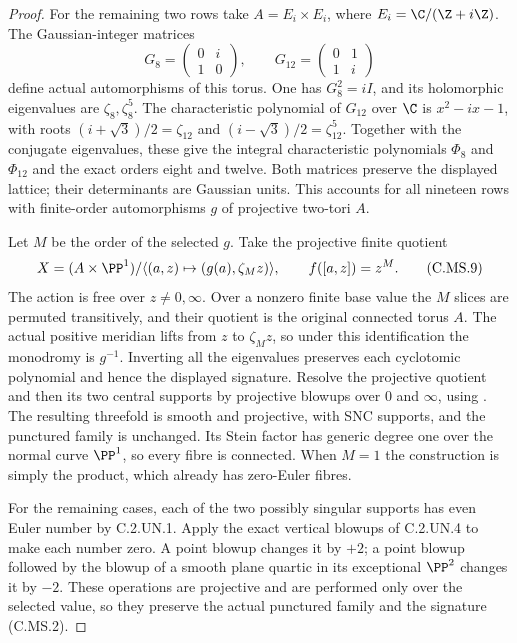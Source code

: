 \begin{proof}
For the remaining two rows take
$A=E_i\times E_i$, where
$E_i=\C/(\Z+i\Z)$. The Gaussian-integer
matrices
\[
 G_8=\begin{pmatrix}0&i\\1&0\end{pmatrix},
 \qquad
 G_{12}=\begin{pmatrix}0&1\\1&i\end{pmatrix}
 \tag{C.MS.8}
\]
define actual automorphisms of this torus.
One has $G_8^2=iI$, and its holomorphic
eigenvalues are $\zeta_8,\zeta_8^5$.
The characteristic polynomial of $G_{12}$
over $\C$ is $x^2-ix-1$, with roots
$(i+\sqrt3)/2=\zeta_{12}$ and
$(i-\sqrt3)/2=\zeta_{12}^5$.
Together with the conjugate eigenvalues,
these give the integral characteristic
polynomials $\Phi_8$ and $\Phi_{12}$ and
the exact orders eight and twelve.
Both matrices preserve the displayed lattice;
their determinants are Gaussian units.
This accounts for all nineteen rows with
finite-order automorphisms $g$ of projective
two-tori $A$.

Let $M$ be the order of the selected $g$.
Take the projective finite quotient
\[
 X=(A\times\PP^1)/
       \langle(a,z)\mapsto(g(a),\zeta_Mz)\rangle,
 \qquad f([a,z])=z^M.                           \tag{C.MS.9}
\]
The action is free over $z\ne0,\infty$.
Over a nonzero finite base value the $M$
slices are permuted transitively, and their
quotient is the original connected torus $A$.
The actual positive meridian lifts from $z$
to $\zeta_Mz$, so under this identification
the monodromy is $g^{-1}$. Inverting all
the eigenvalues preserves each cyclotomic
polynomial and hence the displayed signature.
Resolve the projective quotient and then its
two central supports by projective blowups
over $0$ and $\infty$, using
\cite[Theorem~1.6]{BierstoneMilman1997}.
The resulting threefold is smooth and projective,
with SNC supports, and the punctured family is
unchanged. Its Stein factor has generic
degree one over the normal curve $\PP^1$,
so every fibre is connected. When $M=1$
the construction is simply the product,
which already has zero-Euler fibres.

For the remaining cases, each of the two
possibly singular supports has even Euler
number by C.2.UN.1. Apply the exact vertical
blowups of C.2.UN.4 to make each number
zero. A point blowup changes it by $+2$;
a point blowup followed by the blowup of
a smooth plane quartic in its exceptional
$\PP^2$ changes it by $-2$. These
operations are projective and are performed
only over the selected value, so they
preserve the actual punctured family and
the signature (C.MS.2).


\end{proof}

